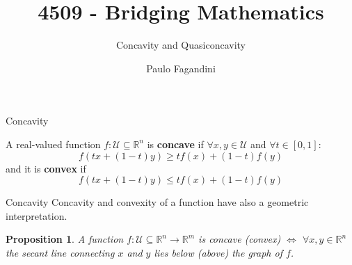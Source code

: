 \documentclass[aspectratio=169]{beamer}
\title[]{4509 - Bridging Mathematics}
\subtitle{Concavity and Quasiconcavity}
\author[P. Fagandini]{Paulo Fagandini}
\institute[]{}
\date{}
\newtheorem{proposition}{Proposition}
\begin{document}
\begin{frame}{Concavity}

\begin{definition}
    A real-valued function $f:\mathcal{U}\subseteq \mathbb{R}^n$ is \textbf{concave} if $\forall x,y \in\mathcal{U}$ and $\forall t\in[0,1]$:
    \[f(tx+(1-t)y)\geq tf(x)+(1-t)f(y)\]
    and it is \textbf{convex} if
    \[f(tx+(1-t)y)\leq tf(x)+(1-t)f(y)\]
\end{definition}

\end{frame}

\begin{frame}{Concavity}
    Concavity and convexity of a function have also a geometric interpretation.    
    \vspace{1em}

    \begin{proposition}
        A function $f:\mathcal{U}\subseteq \mathbb{R}^n\rightarrow\mathbb{R}^m$ is concave (convex) $\Leftrightarrow$ $\forall x,y\in\mathbb{R}^n$ the secant line connecting $x$ and $y$ lies \textit{below (above)} the graph of $f$.
    \end{proposition}

\end{frame}
\end{document}
